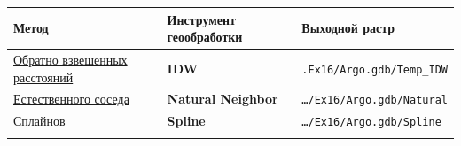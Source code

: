 \documentclass[]{book}
\theoremstyle{definition}
\theoremstyle{definition}
\theoremstyle{definition}
\theoremstyle{remark}
\begin{document}
\begin{longtable}[]{@{}lll@{}}
\toprule
\begin{minipage}[b]{0.12\columnwidth}\raggedright
Метод\strut
\end{minipage} & \begin{minipage}[b]{0.50\columnwidth}\raggedright
Инструмент геообработки\strut
\end{minipage} & \begin{minipage}[b]{0.30\columnwidth}\raggedright
Выходной растр\strut
\end{minipage}\tabularnewline
\midrule
\endhead
\begin{minipage}[t]{0.12\columnwidth}\raggedright
\href{http://desktop.arcgis.com/ru/arcmap/latest/tools/3d-analyst-toolbox/how-idw-works.htm}{Обратно
взвешенных расстояний}\strut
\end{minipage} & \begin{minipage}[t]{0.50\columnwidth}\raggedright
\textbf{IDW}\strut
\end{minipage} & \begin{minipage}[t]{0.30\columnwidth}\raggedright
\texttt{.Ex16/Argo.gdb/Temp\_IDW}\strut
\end{minipage}\tabularnewline
\begin{minipage}[t]{0.12\columnwidth}\raggedright
\href{http://desktop.arcgis.com/ru/arcmap/latest/tools/3d-analyst-toolbox/how-natural-neighbor-works.htm}{Естественного
соседа}\strut
\end{minipage} & \begin{minipage}[t]{0.50\columnwidth}\raggedright
\textbf{Natural Neighbor}\strut
\end{minipage} & \begin{minipage}[t]{0.30\columnwidth}\raggedright
\texttt{\ldots{}/Ex16/Argo.gdb/Natural}\strut
\end{minipage}\tabularnewline
\begin{minipage}[t]{0.12\columnwidth}\raggedright
\href{http://desktop.arcgis.com/ru/arcmap/latest/tools/3d-analyst-toolbox/how-spline-works.htm}{Сплайнов}\strut
\end{minipage} & \begin{minipage}[t]{0.50\columnwidth}\raggedright
\textbf{Spline}\strut
\end{minipage} & \begin{minipage}[t]{0.30\columnwidth}\raggedright
\texttt{\ldots{}/Ex16/Argo.gdb/Spline}\strut
\end{minipage}\tabularnewline
\begin{minipage}[t]{0.12\columnwidth}\raggedright

\end{minipage}
\end{longtable}
\end{document}
